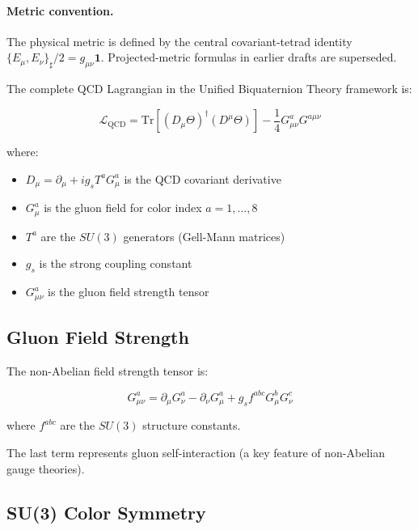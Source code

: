 \paragraph{Metric convention.} The physical metric is defined by the central covariant-tetrad identity $\{E_\mu,E_\nu\}_\sharp/2=g_{\mu\nu}\mathbf1$.  Projected-metric formulas in earlier drafts are superseded.

The complete QCD Lagrangian in the Unified Biquaternion Theory framework is:

\begin{equation}
\label{eq:canonical:qcd_lagrangian}
\boxed{\mathcal{L}_{\text{QCD}} = \text{Tr}\left[(D_\mu\Theta)^\dagger (D^\mu\Theta)\right] - \frac{1}{4} G^a_{\mu\nu} G^{a\mu\nu}}
\end{equation}

\noindent where:
\begin{itemize}
    \item $D_\mu = \partial_\mu + ig_s T^a G^a_\mu$ is the QCD covariant derivative
    \item $G^a_\mu$ is the gluon field for color index $a = 1, \ldots, 8$
    \item $T^a$ are the $SU(3)$ generators (Gell-Mann matrices)
    \item $g_s$ is the strong coupling constant
    \item $G^a_{\mu\nu}$ is the gluon field strength tensor
\end{itemize}

\subsection{Gluon Field Strength}

The non-Abelian field strength tensor is:

\begin{equation}
\label{eq:canonical:gluon_field_strength}
G^a_{\mu\nu} = \partial_\mu G^a_\nu - \partial_\nu G^a_\mu + g_s f^{abc} G^b_\mu G^c_\nu
\end{equation}

\noindent where $f^{abc}$ are the $SU(3)$ structure constants.

The last term represents gluon self-interaction (a key feature of non-Abelian gauge theories).

\subsection{SU(3) Color Symmetry}

